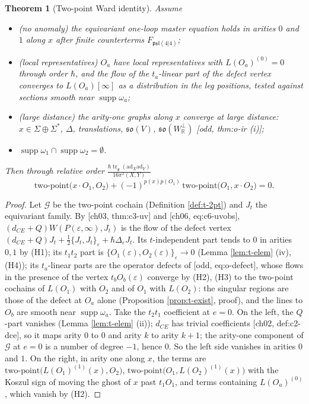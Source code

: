 \documentclass[11pt]{report}
\theoremstyle{plain}
\newtheorem{theorem}{Theorem}[chapter]
\theoremstyle{definition}
\numberwithin{equation}{chapter}
\newcommand{\unit}{\tfrac{\hbar\operatorname{tr}_{\mathfrak g}(\mathrm{ad}_X\mathrm{ad}_Y)}{16\pi^2(X,Y)}}
\newcommand{\Wp}{W_{\mathbb R}^\perp}
\newcommand{\TP}[2]{\mathrm{two\mbox{-}point}\big(#1,#2\big)}
\begin{document}
\begin{theorem}[Two-point Ward identity]
\label{thm:t-ward}
Assume
\begin{itemize}
\item[(H1)] (no anomaly) the equivariant one-loop master equation holds in arities $0$ and $1$ along $x$ after finite counterterms $F_{\mathfrak{psl}(4|4)}$;
\item[(H2)] (local representatives) $O_a$ have local representatives with $L(O_a)^{(0)}=0$ through order $\hbar$, and the flow of the $t_a$-linear part of the defect vertex converges to $L(O_a)[\infty]$ as a distribution in the leg positions, tested against sections smooth near $\operatorname{supp}\omega_a$;
\item[(H3)] (large distance) the arity-one graphs along $x$ converge at large distance: $x\in\Sigma\oplus\Sigma^*$, $\Delta$, translations, $\mathfrak{so}(V)$, $\mathfrak{so}(\Wp)$ [odd, thm:o-ir (i)];
\item[(H4)] $\operatorname{supp}\omega_1\cap\operatorname{supp}\omega_2=\emptyset$.
\end{itemize}
Then through relative order $\unit$
\begin{equation}
\TP{x\cdot O_1}{O_2}+(-1)^{p(x)p(O_1)}\,\TP{O_1}{x\cdot O_2}=0 .
\label{eq:t-ward}
\end{equation}
\end{theorem}

\begin{proof}
Let $\mathscr G$ be the two-point cochain (Definition \ref{def:t-2pt}) and $J_t$ the equivariant family. By [ch03, thm:c3-uv] and [ch06, eq:c6-uvobs], $(d_{CE}+Q)W(P(\varepsilon,\infty),J_t)$ is the flow of the defect vertex $(d_{CE}+Q)J_t+\tfrac12\{J_t,J_t\}_\varepsilon+\hbar\Delta_\varepsilon J_t$. Its $t$-independent part tends to $0$ in arities $0,1$ by (H1); its $t_1t_2$ part is $\{O_1(\varepsilon),O_2(\varepsilon)\}_\varepsilon\to0$ (Lemma \ref{lem:t-elem} (iv), (H4)); its $t_a$-linear parts are the operator defects of [odd, eq:o-defect], whose flows in the presence of the vertex $t_bO_b(\varepsilon)$ converge by (H2), (H3) to the two-point cochains of $L(O_1)$ with $O_2$ and of $O_1$ with $L(O_2)$: the singular regions are those of the defect at $O_a$ alone (Proposition \ref{prop:t-exist}, proof), and the lines to $O_b$ are smooth near $\operatorname{supp}\omega_a$. Take the $t_2t_1$ coefficient at $e=0$. On the left, the $Q$-part vanishes (Lemma \ref{lem:t-elem} (ii)); $d_{CE}$ has trivial coefficients [ch02, def:c2-dce], so it maps arity $0$ to $0$ and arity $k$ to arity $k+1$; the arity-one component of $\mathscr G$ at $e=0$ is a number of degree $-1$, hence $0$. So the left side vanishes in arities $0$ and $1$. On the right, in arity one along $x$, the terms are $\TP{L(O_1)^{(1)}(x)}{O_2}$, $\TP{O_1}{L(O_2)^{(1)}(x)}$ with the Koszul sign of moving the ghost of $x$ past $t_1O_1$, and terms containing $L(O_a)^{(0)}$, which vanish by (H2).
\end{proof}
\end{document}
